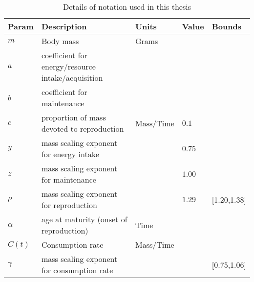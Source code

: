 \documentclass[a4paper]{article} %
\begin{document}
\begin{table}
    \caption{Details of notation used in this thesis}

    \begin{tabularx}{\linewidth}{|l|X|l|X|l|}
    \hline
    Param               & Description                                                       & Units                     & Value                                         & Bounds        \\ \hline
    $m$                 & Body mass                                                         & Grams                     &                                               &               \\ \hline
    $a$                 & coefficient for energy/resource intake/acquisition                &                           &                                               &               \\ \hline
    $b$                 & coefficient for maintenance                                       &                           &                                               &               \\ \hline
    $c$                 & proportion of mass devoted to reproduction                        & Mass/Time                 & $0.1$ \autocite{peters1983,Blueweiss1978}     &                \\ \hline
    $y$                 & mass scaling exponent for energy intake                           &                           & $0.75$                                        &               \\ \hline
    $z$                 & mass scaling exponent for maintenance                             &                           & $1.00$                                        &               \\ \hline
    $\rho$              & mass scaling exponent for reproduction                            &                           & $1.29$ \autocite{Barneche2018d}               & [1.20,1.38]   \\ \hline
    $\alpha$            & age at maturity (onset of reproduction)                           & Time                      &                                               &               \\ \hline
    $C(t)$              & Consumption rate                                                  & Mass/Time                 &                                               &               \\ \hline
    $\gamma$            & mass scaling exponent for consumption rate                        &                           &                                               & [0.75,1.06]   \\ \hline

\end{tabularx}
\end{table}
\end{document}
